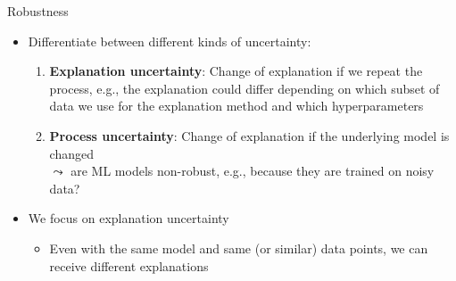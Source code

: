 \documentclass[11pt,compress,t,notes=noshow, aspectratio=169, xcolor=table]{beamer}
\begin{document}
\begin{frame}[c]{Robustness}
		\begin{itemize}
		\item Differentiate between different kinds of uncertainty: 
		\begin{enumerate}
			\item \textbf{Explanation uncertainty}: Change of explanation if we repeat the process, e.g., the explanation could differ depending on which subset of data we use for the explanation method and which hyperparameters 
			\pause
			\item \textbf{Process uncertainty}: Change of explanation if the underlying model is changed\\ $\leadsto$ are ML models non-robust, e.g., because they are trained on noisy data?
		\end{enumerate}
		\pause
		\item We focus on explanation uncertainty 
		\begin{itemize}
		    \item Even with the same model and same (or similar) data points, we can receive different explanations
		\end{itemize}
	\end{itemize}
\end{frame}
\end{document}
